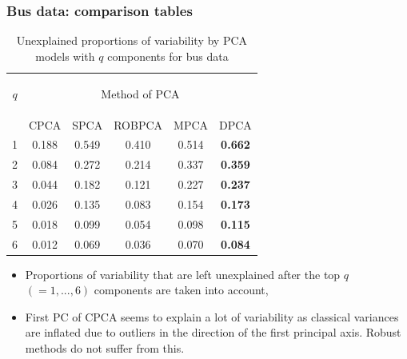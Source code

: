 \documentclass[handout,10pt]{beamer}
\begin{document}
\begin{frame}
\frametitle{Bus data: comparison tables}

\begin{footnotesize}
\begin{table}[t]
\centering
    \begin{tabular}{c|ccccc}
    \hline
    \begin{large} $q$ \end{large} & \multicolumn{5}{c}{Method of PCA}         \\ \cline{2-6}
    ~                   & CPCA     & SPCA & ROBPCA & MPCA & DPCA \\\hline 
    1                   & 0.188         & 0.549     & 0.410  & 0.514     & \textbf{0.662}     \\
    2                   & 0.084         & 0.272     & 0.214  & 0.337     & \textbf{0.359}     \\
    3                   & 0.044         & 0.182     & 0.121  & 0.227     & \textbf{0.237}     \\
    4                   & 0.026         & 0.135     & 0.083  & 0.154     & \textbf{0.173}     \\
    5                   & 0.018         & 0.099     & 0.054  & 0.098     & \textbf{0.115}     \\
    6                   & 0.012         & 0.069     & 0.036  & 0.070     & \textbf{0.084}     \\ \hline
    \end{tabular}
    \caption{Unexplained proportions of variability by PCA models with $q$ components for bus data}
    \label{table:bus_table1}
\end{table}
\end{footnotesize}

\begin{itemize}
\item Proportions of variability that are left unexplained after the top $q$ $(= 1,...,6)$ components are taken into account,
\vspace{.2cm}
\item First PC of CPCA seems to explain a lot of variability as classical variances are inflated due to outliers in the direction of the first principal axis. Robust methods do not suffer from this.
\end{itemize}
\end{frame}
\end{document}
